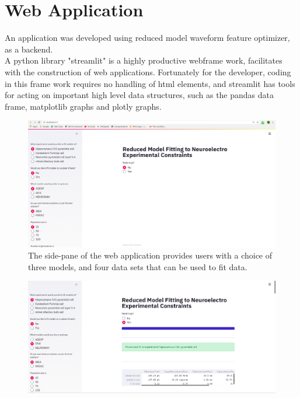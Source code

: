 \section{Web Application}
An application was developed using reduced model waveform feature optimizer, as a backend. %
\\
A python library "streamlit" is a highly productive webframe work, facilitates with the construction of web applications. Fortunately for the developer, coding in this frame work requires no handling of html elements, and streamlit has tools for acting on important high level data structures, such as the pandas data frame, matplotlib graphs and plotly graphs.\\
\begin{figure}
\begin{center}

\includegraphics[scale=0.5]{chapters/app_tex/web_app_thesis}
\caption{The side-pane of the web application provides users with a choice of three models, and four data sets that can be used to fit data.
}
\end{center}

\end{figure}
\begin{figure}
\begin{center}

\includegraphics[scale=0.5]{chapters/app_tex/app_results}
\end{center}

\end{figure}

